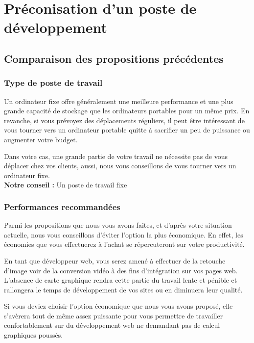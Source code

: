 \chapter{Préconisation d'un poste de développement}

\section{Comparaison des propositions précédentes}

\subsection{Type de poste de travail}

Un ordinateur fixe offre généralement une meilleure performance et une plus grande capacité de stockage que les ordinateurs portables pour un même prix. En revanche, si vous prévoyez des déplacements réguliers, il peut être intéressant de vous tourner vers un ordinateur portable quitte à sacrifier un peu de puissance ou augmenter votre budget.

Dans votre cas, une grande partie de votre travail ne nécessite pas de vous déplacer chez vos clients, aussi, nous vous conseillons de vous tourner vers un ordinateur fixe.\\

\textbf{Notre conseil :} Un poste de travail fixe

\subsection{Performances recommandées}

Parmi les propositions que nous vous avons faites, et d'après votre situation actuelle, nous vous conseillons d'éviter l'option la plus économique. En effet, les économies que vous effectuerez à l'achat se répercuteront sur votre productivité.

En tant que développeur web, vous serez amené à effectuer de la retouche d'image voir de la conversion vidéo à des fins d'intégration sur vos pages web. L'absence de carte graphique rendra cette partie du travail lente et pénible et rallongera le temps de développement de vos sites ou en diminuera leur qualité.

Si vous deviez choisir l'option économique que nous vous avons proposé, elle s'avèrera tout de même assez puissante pour vous permettre de travailler confortablement sur du développement web ne demandant pas de calcul graphiques poussés.\\

